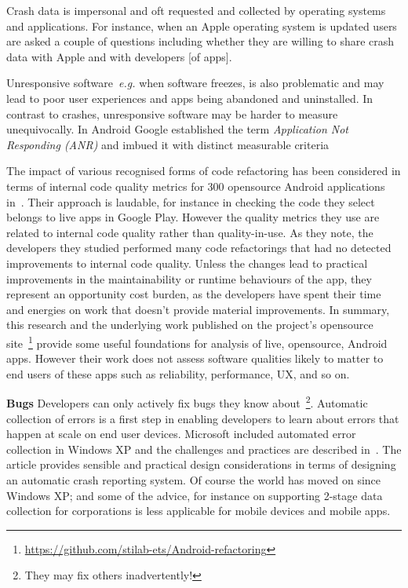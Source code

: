 
Crash data is impersonal and oft requested and collected by operating systems and applications. For instance, when an Apple operating system is updated users are asked a couple of questions including whether they are willing to share crash data with Apple and with developers [of apps].

Unresponsive software~\emph{e.g.} when software freezes, is also problematic and may lead to poor user experiences and apps being abandoned and uninstalled. In contrast to crashes, unresponsive software may be harder to measure unequivocally. In Android Google established the term \emph{Application Not Responding (ANR)} and imbued it with distinct measurable criteria %




The impact of various recognised forms of code refactoring has been considered in terms of internal code quality metrics for 300 opensource Android applications in~\citep{Hamdi2021empirical}. Their approach is laudable, for instance in checking the code they select belongs to live apps in Google Play. However the quality metrics they use are related to internal code quality rather than quality-in-use. As they note, the developers they studied performed many code refactorings that had no detected improvements to internal code quality. Unless the changes lead to practical improvements in the maintainability or runtime behaviours of the app, they represent an opportunity cost burden, as the developers have spent their time and energies on work that doesn't provide material improvements. In summary, this research and the underlying work published on the project's opensource site~\footnote{\url{https://github.com/stilab-ets/Android-refactoring}} provide some useful foundations for analysis of live, opensource, Android apps. However their work does not assess software qualities likely to matter to end users of these apps such as reliability, performance, UX, and so on.


\textbf{Bugs} Developers can only actively fix bugs they know about~\footnote{They may fix others inadvertently!}. Automatic collection of errors is a first step in enabling developers to learn about errors that happen at scale on end user devices. Microsoft included automated error collection in Windows XP and the challenges and practices are described in~\citep{murphy2004_automating_software_failure_reporting}. The article provides sensible and practical design considerations in terms of designing an automatic crash reporting system. Of course the world has moved on since Windows XP; and some of the advice, for instance on supporting 2-stage data collection for corporations is less applicable for mobile devices and mobile apps. 

